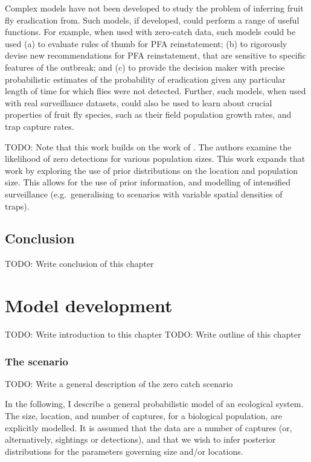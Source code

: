 \documentclass[
]{book}
\begin{document}
Complex models have not been developed to study the problem of inferring fruit fly eradication from. Such models, if developed, could perform a range of useful functions. For example, when used with zero-catch data, such models could be used (a) to evaluate rules of thumb for PFA reinstatement; (b) to rigorously devise new recommendations for PFA reinstatement, that are sensitive to specific features of the outbreak; and (c) to provide the decision maker with precise probabilistic estimates of the probability of eradication given any particular length of time for which flies were not detected. Further, such models, when used with real surveillance datasets, could also be used to learn about crucial properties of fruit fly species, such as their field population growth rates, and trap capture rates.

TODO: Note that this work builds on the work of \citet{lg1994}. The authors examine the likelihood of zero detections for various population sizes. This work expands that work by exploring the use of prior distributions on the location and population size. This allows for the use of prior information, and modelling of intensified surveillance (e.g.~generalising to scenarios with variable spatial densities of traps).

\hypertarget{conclusion}{%
\section{Conclusion}\label{conclusion}}

TODO: Write conclusion of this chapter

\hypertarget{model-development}{%
\chapter{Model development}\label{model-development}}

TODO: Write introduction to this chapter
TODO: Write outline of this chapter

\hypertarget{the-scenario}{%
\subsection{The scenario}\label{the-scenario}}

TODO: Write a general description of the zero catch scenario

In the following, I describe a general probabilistic model of an ecological system. The size, location, and number of captures, for a biological population, are explicitly modelled. It is assumed that the data are a number of captures (or, alternatively, sightings or detections), and that we wish to infer posterior distributions for the parameters governing size and/or locations.
\end{document}
